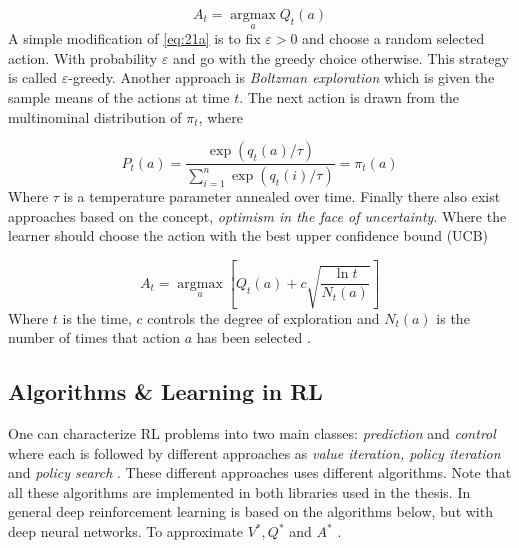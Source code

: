 \documentclass{kththesis}
\theoremstyle{definition}
\begin{document}
\begin{equation}
    \label{eq:21a}
    A_t = \underset{a}{\operatorname{argmax}}Q_t(a)
\end{equation}
A simple modification of \autoref{eq:21a} is to fix $\varepsilon > 0$ and choose a random selected action. With probability $\varepsilon$ and go with the greedy choice otherwise. This strategy is called $\varepsilon$-greedy. Another approach is \textit{Boltzman exploration} \parencite{sutton1998reinforcement,szepesvari2009algorithms} which is given the sample means of the actions at time $t$. The next action is drawn from the multinominal distribution of $\pi_t$, where 

\begin{equation}
    \label{eq:21b}
    P_t(a) = \frac{\exp{(q_{t}(a)/\tau)}}{ \sum_{i=1}^{n}{\exp{(q_{t}(i)/ \tau)}}} = \pi_t(a)
\end{equation}
Where $ \tau$ is a temperature parameter annealed over time.
Finally there also exist approaches based on the concept, \textit{optimism in the face of uncertainty}.  Where the learner should choose the action with the best upper confidence bound (UCB) \parencite{sutton1998reinforcement, szepesvari2009algorithms}

\begin{equation}
    \label{eq:21c}
    A_t = \underset{a}{\operatorname{argmax}} \left[Q_t(a) + c \sqrt{\frac{\ln{t}}{N_t(a)}} \right]
\end{equation}
Where $t$ is the time, $c$ controls the degree of exploration and $N_t(a)$ is the number of times that action $a$ has been selected \parencite{sutton1998reinforcement}.

\newpage

\subsection{Algorithms \& Learning in RL}
One can characterize RL problems into two main classes: \textit{prediction} and \textit{control} where each is followed by different approaches as \textit{value iteration, policy iteration} and \textit{policy search} \parencite{szepesvari2009algorithms}. These different approaches uses different algorithms. Note that all these algorithms are implemented in both \parencite{plappert2016kerasrl, baselines} libraries used in the thesis. In general deep reinforcement learning is based on the algorithms below, but with deep neural networks. To approximate $V^{*}, Q^{*}$ and $A^{*}$ \parencite{arulkumaran2017brief}. 
\end{document}
